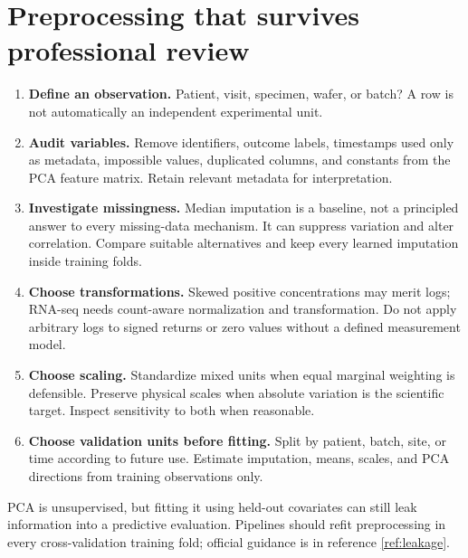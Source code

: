 \documentclass[11pt]{article}
\begin{document}
\section{Preprocessing that survives professional review}
\begin{enumerate}
\item \textbf{Define an observation.} Patient, visit, specimen, wafer, or batch? A row is not automatically an independent experimental unit.
\item \textbf{Audit variables.} Remove identifiers, outcome labels, timestamps used only as metadata, impossible values, duplicated columns, and constants from the PCA feature matrix. Retain relevant metadata for interpretation.
\item \textbf{Investigate missingness.} Median imputation is a baseline, not a principled answer to every missing-data mechanism. It can suppress variation and alter correlation. Compare suitable alternatives and keep every learned imputation inside training folds.
\item \textbf{Choose transformations.} Skewed positive concentrations may merit logs; RNA-seq needs count-aware normalization and transformation. Do not apply arbitrary logs to signed returns or zero values without a defined measurement model.
\item \textbf{Choose scaling.} Standardize mixed units when equal marginal weighting is defensible. Preserve physical scales when absolute variation is the scientific target. Inspect sensitivity to both when reasonable.
\item \textbf{Choose validation units before fitting.} Split by patient, batch, site, or time according to future use. Estimate imputation, means, scales, and PCA directions from training observations only.
\end{enumerate}
PCA is unsupervised, but fitting it using held-out covariates can still leak information into a predictive evaluation. Pipelines should refit preprocessing in every cross-validation training fold; official guidance is in reference \ref{ref:leakage}.
\end{document}
